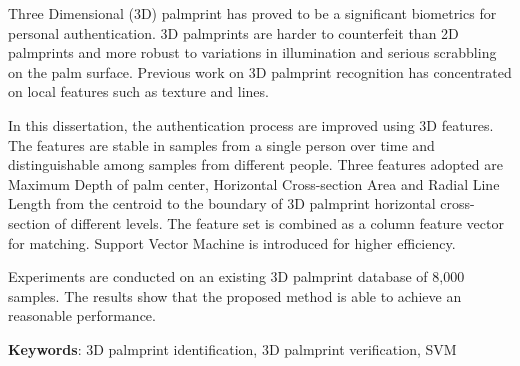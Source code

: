 Three Dimensional (3D) palmprint has proved to be a significant biometrics for personal authentication. 3D palmprints are harder to counterfeit than 2D palmprints and more robust to variations in illumination and serious scrabbling on the palm surface. Previous work on 3D palmprint recognition has concentrated on local features such as texture and lines.

In this dissertation, the authentication process are improved using 3D features. The features are stable in samples from a single person over time and distinguishable among samples from different people. Three features adopted are Maximum Depth of palm center, Horizontal Cross-section Area and Radial Line Length from the centroid to the boundary of 3D palmprint horizontal cross-section of different levels. The feature set is combined as a column feature vector for matching. Support Vector Machine is introduced for higher efficiency.

Experiments are conducted on an existing 3D palmprint database of 8,000 samples. The results show that the proposed method is able to achieve an reasonable performance.


\textbf{Keywords}: 3D palmprint identification, 3D palmprint verification, SVM